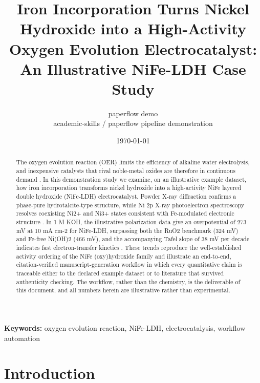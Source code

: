 \documentclass[11pt,a4paper]{article}
\title{Iron Incorporation Turns Nickel Hydroxide into a High-Activity Oxygen Evolution Electrocatalyst: An Illustrative NiFe-LDH Case Study}
\author{paperflow demo\\ \small academic-skills / paperflow pipeline demonstration}
\date{\today}
\begin{document}
\maketitle

\begin{abstract}
The oxygen evolution reaction (OER) limits the efficiency of alkaline water electrolysis, and inexpensive catalysts that rival noble-metal oxides are therefore in continuous demand \citep{mccrory2013}. In this demonstration study we examine, on an illustrative example dataset, how iron incorporation transforms nickel hydroxide into a high-activity NiFe layered double hydroxide (NiFe-LDH) electrocatalyst. Powder X-ray diffraction confirms a phase-pure hydrotalcite-type structure, while Ni 2p X-ray photoelectron spectroscopy resolves coexisting Ni2+ and Ni3+ states consistent with Fe-modulated electronic structure \citep{trotochaud2014}. In 1 M KOH, the illustrative polarization data give an overpotential of 273 mV at 10 mA cm-2 for NiFe-LDH, surpassing both the RuO2 benchmark (324 mV) and Fe-free Ni(OH)2 (466 mV), and the accompanying Tafel slope of 38 mV per decade indicates fast electron-transfer kinetics \citep{dionigi2016}. These trends reproduce the well-established activity ordering of the NiFe (oxy)hydroxide family and illustrate an end-to-end, citation-verified manuscript-generation workflow in which every quantitative claim is traceable either to the declared example dataset or to literature that survived authenticity checking. The workflow, rather than the chemistry, is the deliverable of this document, and all numbers herein are illustrative rather than experimental.
\end{abstract}

\medskip
\noindent\textbf{Keywords:} oxygen evolution reaction, NiFe-LDH, electrocatalysis, workflow automation

\begin{center}\end{center}

\section{Introduction}
\end{document}
